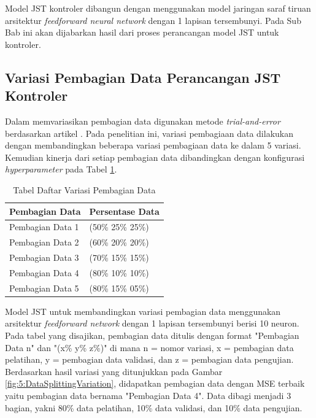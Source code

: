Model JST kontroler dibangun dengan menggunakan model jaringan saraf tiruan arsitektur \textit{feedforward neural network} dengan 1 lapisan tersembunyi. Pada Sub Bab ini akan dijabarkan hasil dari proses perancangan model JST untuk kontroler.

\subsection{Variasi Pembagian Data Perancangan JST Kontroler}

Dalam memvariasikan pembagian data digunakan metode \textit{trial-and-error} berdasarkan artikel \cite{DataSplitting}. Pada penelitian ini, variasi pembagiaan data dilakukan dengan membandingkan beberapa variasi pembagiaan data ke dalam 5 variasi. Kemudian kinerja dari setiap pembagian data dibandingkan dengan konfigurasi \textit{hyperparameter} pada Tabel \ref{tbl:5:NeuronVariation}.

\begin{table}[!h]
	\caption{Tabel Daftar Variasi Pembagian Data}
	\label{tbl:5:NeuronVariation}
	\centering
	\begin{tabular}{|p{3.2cm}|p{3cm}|}
		\hline
		\textbf{Pembagian Data} & \textbf{Persentase Data} \\ \hline
		Pembagian Data 1 & (50\% 25\% 25\%) \\ \hline
		Pembagian Data 2 & (60\% 20\% 20\%) \\ \hline
		Pembagian Data 3 & (70\% 15\% 15\%) \\ \hline
		Pembagian Data 4 & (80\% 10\% 10\%) \\ \hline
		Pembagian Data 5 & (80\% 15\% 05\%) \\ \hline
	\end{tabular}
\end{table}

Model JST untuk membandingkan variasi pembagian data menggunakan arsitektur \textit{feedforward network} dengan 1 lapisan tersembunyi berisi 10 neuron. Pada tabel yang disajikan, pembagian data ditulis dengan format "Pembagian Data n" dan "(x\% y\% z\%)" di mana n = nomor variasi, x = pembagian data pelatihan, y = pembagian data validasi, dan z = pembagian data pengujian. Berdasarkan hasil variasi yang ditunjukkan pada Gambar \ref{fig:5:DataSplittingVariation}, didapatkan pembagian data dengan MSE terbaik yaitu pembagian data bernama "Pembagian Data 4". Data dibagi menjadi 3 bagian, yakni 80\% data pelatihan, 10\% data validasi, dan 10\% data pengujian.

